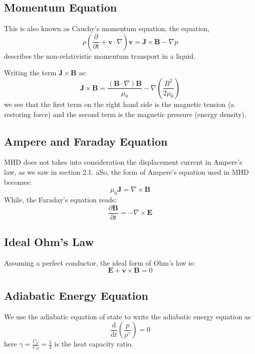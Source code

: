 \documentclass[12pt]{article}
\newenvironment{changemargin}[2]{
\begin{list}{}{
\setlength{\topsep}{0pt}
\setlength{\leftmargin}{#1}
\setlength{\rightmargin}{#2}
\setlength{\listparindent}{\parindent}
\setlength{\itemindent}{\parindent}
\setlength{\parsep}{\parskip}
}
\item[]}{\end{list}}
\begin{document}
\begin{changemargin}{-2cm}{-2cm}
    \subsection{Momentum Equation}
    This is also known as Cauchy's momentum equation, the equation,
    \begin{equation}\label{eq:momentum}
        \rho \left({\frac {\partial }{\partial t}}+\mathbf {v} \cdot \nabla \right)\mathbf {v} =\mathbf {J} \times \mathbf {B} -\nabla p
    \end{equation}
    describes the non-relativistic momentum transport in a liquid.\cite
    {wiki-momentum}

    Writing the term $\mathbf {J} \times \mathbf {B}$ as:
    \begin{equation}\label{eq:j-b}
        \mathbf {J} \times \mathbf {B} ={\frac {\left(\mathbf {B} \cdot \nabla \right)\mathbf {B} }{\mu _{0}}}-\nabla \left({\frac {B^{2}}{2\mu _{0}}}\right)
    \end{equation}
    we see that the first term on the right hand side is the magnetic tension (a restoring force) and the second term is the magnetic pressure (energy density).

    \subsection{Ampere and Faraday Equation}
    MHD does not takes into consideration the displacement current in Ampere's law, as we saw in section 2.1. aSo, the form of Ampere's equation used in MHD becomes:
    \begin{equation}\label{eq:apmere}
        \mu _{0}\mathbf {J} =\nabla \times \mathbf {B}
    \end{equation}
    While, the Faraday's equation reads:
    \begin{equation}\label{eq:faraday}
        {\frac {\partial \mathbf {B} }{\partial t}}=-\nabla \times \mathbf {E}
    \end{equation}
    \subsection{Ideal Ohm's Law}
    Assuming a perfect conductor, the ideal form of Ohm's law is:
    \begin{equation}\label{eq:ohm}
        \mathbf {E} +\mathbf {v} \times \mathbf {B} =0
    \end{equation}

    \subsection{Adiabatic Energy Equation}
    We use the adiabatic equation of state to write the adiabatic energy equation as
    \begin{equation}\label{eq:energy}
        {\frac {\mathrm {d} }{\mathrm {d} t}}\left({\frac {p}{\rho ^{\gamma }}}\right)=0
    \end{equation}
    here $\gamma = \frac{C_V}{C_P}= \frac{5}{3}$ is the heat capacity ratio.


\end{changemargin}
\end{document}
